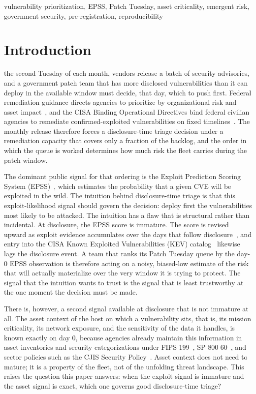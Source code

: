 \documentclass[journal]{IEEEtran}
\begin{document}
\begin{IEEEkeywords}
vulnerability prioritization, EPSS, Patch Tuesday, asset criticality, emergent risk,
government security, pre-registration, reproducibility
\end{IEEEkeywords}

\section{Introduction}
 the second Tuesday of each month, vendors release a batch of security
advisories, and a government patch team that has more disclosed vulnerabilities than it can deploy
in the available window must decide, that day, which to push first. Federal remediation guidance
directs agencies to prioritize by organizational risk and asset impact~\cite{nist80053,fips199},
and the CISA Binding Operational Directives bind federal civilian agencies to remediate
confirmed-exploited vulnerabilities on fixed timelines~\cite{cisabod2201,cisabod2301}. The monthly
release therefore forces a disclosure-time triage decision under a remediation capacity that
covers only a fraction of the backlog, and the order in which the queue is worked determines how
much risk the fleet carries during the patch window.

The dominant public signal for that ordering is the Exploit Prediction Scoring System
(EPSS)~\cite{jacobs2021epss}, which estimates the probability that a given CVE will be exploited in
the wild. The intuition behind disclosure-time triage is that this exploit-likelihood signal should
govern the decision: deploy first the vulnerabilities most likely to be attacked. The intuition has
a flaw that is structural rather than incidental. At disclosure, the EPSS score is immature. The
score is revised upward as exploit evidence accumulates over the days that follow
disclosure~\cite{jacobs2023enhancing,firstepss}, and entry into the CISA Known Exploited
Vulnerabilities (KEV) catalog~\cite{cisakev} likewise lags the disclosure event. A team that ranks
its Patch Tuesday queue by the day-0 EPSS observation is therefore acting on a noisy, biased-low
estimate of the risk that will actually materialize over the very window it is trying to protect.
The signal that the intuition wants to trust is the signal that is least trustworthy at the one
moment the decision must be made.

There is, however, a second signal available at disclosure that is not immature at all. The asset
context of the host on which a vulnerability sits, that is, its mission criticality, its network
exposure, and the sensitivity of the data it handles, is known exactly on day 0, because agencies
already maintain this information in asset inventories and security categorizations under FIPS
199~\cite{fips199}, SP 800-60~\cite{nist80060}, and sector policies such as the CJIS Security
Policy~\cite{cjis2023}. Asset context does not need to mature; it is a property of the fleet, not
of the unfolding threat landscape. This raises the question this paper answers: when the exploit
signal is immature and the asset signal is exact, which one governs good disclosure-time triage?
\end{document}
